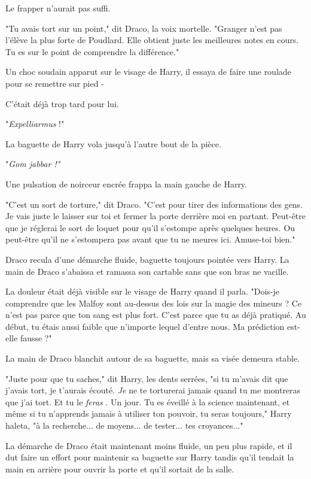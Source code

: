 Le frapper n'aurait pas suffi.

"Tu avais tort sur un point," dit Draco, la voix mortelle. "Granger n'est pas l'élève la plus forte de Poudlard. Elle obtient juste les meilleures notes en cours. Tu es sur le point de comprendre la différence."

Un choc soudain apparut sur le visage de Harry, il essaya de faire une roulade pour se remettre sur pied -

C'était déjà trop tard pour lui.

"\emph{Expelliarmus } !"

La baguette de Harry vola jusqu'à l'autre bout de la pièce.

"\emph{Gom jabbar !"} 

Une pulsation de noirceur encrée frappa la main gauche de Harry.

"C'est un sort de torture," dit Draco. "C'est pour tirer des informations des gens. Je vais juste le laisser sur toi et fermer la porte derrière moi en partant. Peut-être que je réglerai le sort de loquet pour qu'il s'estompe après quelques heures. Ou peut-être qu'il ne s'estompera pas avant que tu ne meures ici. Amuse-toi bien."

Draco recula d'une démarche fluide, baguette toujours pointée vers Harry. La main de Draco s'abaissa et ramassa son cartable sans que son bras ne vacille.

La douleur était déjà visible sur le visage de Harry quand il parla. "Dois-je comprendre que les Malfoy sont au-dessus des lois sur la magie des mineurs ? Ce n'est pas parce que ton sang est plus fort. C'est parce que tu as déjà pratiqué. Au début, tu étais aussi faible que n'importe lequel d'entre nous. Ma prédiction est-elle fausse ?"

La main de Draco blanchit autour de sa baguette, mais sa visée demeura stable.

"Juste pour que tu saches," dit Harry, les dents serrées, "si tu m'avais dit que j'avais tort, je t'aurais écouté. \emph{Je}  ne te torturerai jamais quand tu me montreras que j'ai tort. Et tu le \emph{feras} . Un jour. Tu es éveillé à la science maintenant, et même si tu n'apprends jamais à utiliser ton pouvoir, tu seras toujours," Harry haleta, "à la recherche... de moyens... de tester... tes croyances..."

La démarche de Draco était maintenant moins fluide, un peu plus rapide, et il dut faire un effort pour maintenir sa baguette sur Harry tandis qu'il tendait la main en arrière pour ouvrir la porte et qu'il sortait de la salle.

